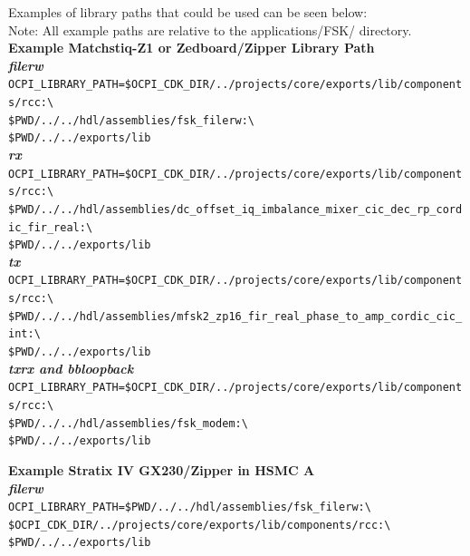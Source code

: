 \noindent Examples of library paths that could be used can be seen below:\\

Note: All example paths are relative to the applications/FSK/ directory.\\

\noindent\textbf{Example Matchstiq-Z1 or Zedboard/Zipper Library Path}\\
\noindent\textbf{\textit{filerw}}\\
\verb|OCPI_LIBRARY_PATH=$OCPI_CDK_DIR/../projects/core/exports/lib/components/rcc:\| \\
\verb|$PWD/../../hdl/assemblies/fsk_filerw:\| \\
\verb|$PWD/../../exports/lib| \\

\noindent\textbf{\textit{rx}}\\
\verb|OCPI_LIBRARY_PATH=$OCPI_CDK_DIR/../projects/core/exports/lib/components/rcc:\| \\
\verb|$PWD/../../hdl/assemblies/dc_offset_iq_imbalance_mixer_cic_dec_rp_cordic_fir_real:\| \\
\verb|$PWD/../../exports/lib| \\

\noindent\textbf{\textit{tx}}\\
\verb|OCPI_LIBRARY_PATH=$OCPI_CDK_DIR/../projects/core/exports/lib/components/rcc:\| \\
\verb|$PWD/../../hdl/assemblies/mfsk2_zp16_fir_real_phase_to_amp_cordic_cic_int:\| \\
\verb|$PWD/../../exports/lib| \\

\noindent\textbf{\textit{txrx and bbloopback}}\\
\verb|OCPI_LIBRARY_PATH=$OCPI_CDK_DIR/../projects/core/exports/lib/components/rcc:\| \\
\verb|$PWD/../../hdl/assemblies/fsk_modem:\| \\
\verb|$PWD/../../exports/lib| \\
\pagebreak

\noindent\textbf{Example Stratix IV GX230/Zipper in HSMC A}\\
\noindent\textbf{\textit{filerw}}\\
\verb|OCPI_LIBRARY_PATH=$PWD/../../hdl/assemblies/fsk_filerw:\| \\
\verb|$OCPI_CDK_DIR/../projects/core/exports/lib/components/rcc:\| \\
\verb|$PWD/../../exports/lib| \\

